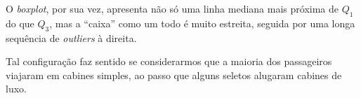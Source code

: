 \documentclass[brazil, a4paper, 11pt]{article}
\begin{document}
	O \emph{boxplot}, por sua vez, apresenta não só uma linha mediana mais próxima de $Q_1$ do que $Q_3$, mas a ``caixa'' como um todo é muito estreita, seguida por uma longa sequência de \emph{outliers} à direita.

	Tal configuração faz sentido se considerarmos que a maioria dos passageiros viajaram em cabines simples, ao passo que alguns seletos alugaram cabines de luxo.
	
\end{document}
